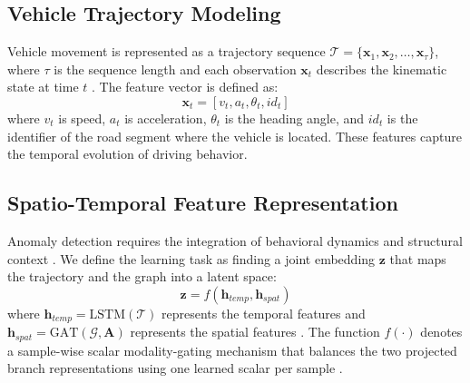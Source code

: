 \documentclass[journal]{IEEEtran}
\begin{document}
\subsection{Vehicle Trajectory Modeling}
Vehicle movement is represented as a trajectory sequence $\mathcal{T} = \{\mathbf{x}_1, \mathbf{x}_2, \dots, \mathbf{x}_\tau\}$, where $\tau$ is the sequence length and each observation $\mathbf{x}_t$ describes the kinematic state at time $t$ \cite{zhou_hybrid_2022, taheri_sarteshnizi_applicability_2026}. The feature vector is defined as:
\begin{equation}
  \mathbf{x}_t = [v_t, a_t, \theta_t, id_t]
\end{equation}
where $v_t$ is speed, $a_t$ is acceleration, $\theta_t$ is the heading angle, and $id_t$ is the identifier of the road segment where the vehicle is located. These features capture the temporal evolution of driving behavior.

\subsection{Spatio-Temporal Feature Representation}
Anomaly detection requires the integration of behavioral dynamics and structural context \cite{hu_dynamic_2026, zhu_spatio-temporal_2026}. We define the learning task as finding a joint embedding $\mathbf{z}$ that maps the trajectory and the graph into a latent space:
\begin{equation}
  \mathbf{z} = f(\mathbf{h}_{temp}, \mathbf{h}_{spat})
\end{equation}
where $\mathbf{h}_{temp} = \text{LSTM}(\mathcal{T})$ represents the temporal features and $\mathbf{h}_{spat} = \text{GAT}(\mathcal{G}, \mathbf{A})$ represents the spatial features \cite{xia_attention-based_2023, wang_multi-scale_2025}. The function $f(\cdot)$ denotes a sample-wise scalar modality-gating mechanism that balances the two projected branch representations using one learned scalar per sample \cite{zhao_starg2n_2025}.
\end{document}
